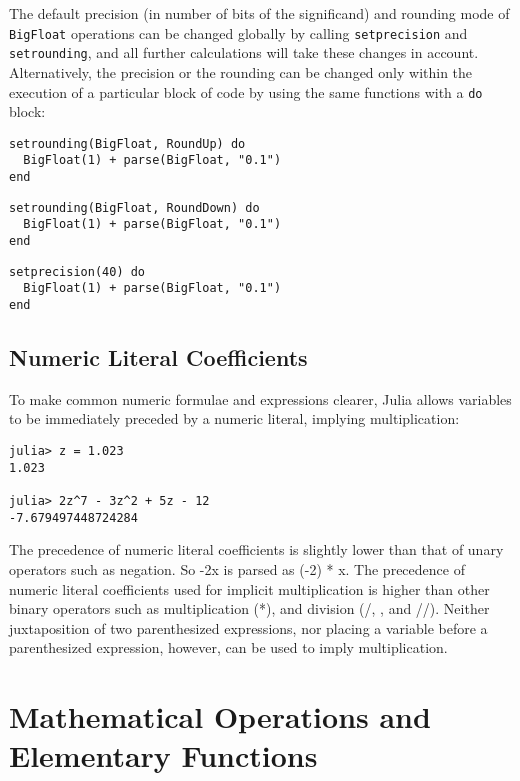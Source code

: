 \documentclass[
]{article}
\begin{document}
The default precision (in number of bits of the significand) and
rounding mode of \texttt{BigFloat} operations can be changed globally by
calling \texttt{setprecision} and \texttt{setrounding}, and all further
calculations will take these changes in account. Alternatively, the
precision or the rounding can be changed only within the execution of a
particular block of code by using the same functions with a \texttt{do}
block:

\begin{verbatim}
setrounding(BigFloat, RoundUp) do
  BigFloat(1) + parse(BigFloat, "0.1")
end
\end{verbatim}

\begin{verbatim}
setrounding(BigFloat, RoundDown) do
  BigFloat(1) + parse(BigFloat, "0.1")
end
\end{verbatim}

\begin{verbatim}
setprecision(40) do
  BigFloat(1) + parse(BigFloat, "0.1")
end
\end{verbatim}

\hypertarget{numeric-literal-coefficients}{%
\subsection{Numeric Literal
Coefficients}\label{numeric-literal-coefficients}}

To make common numeric formulae and expressions clearer, Julia allows
variables to be immediately preceded by a numeric literal, implying
multiplication:

\begin{verbatim}
julia> z = 1.023
1.023

julia> 2z^7 - 3z^2 + 5z - 12
-7.679497448724284
\end{verbatim}

The precedence of numeric literal coefficients is slightly lower than
that of unary operators such as negation. So -2x is parsed as (-2) * x.
The precedence of numeric literal coefficients used for implicit
multiplication is higher than other binary operators such as
multiplication (*), and division (/, , and //). Neither juxtaposition of
two parenthesized expressions, nor placing a variable before a
parenthesized expression, however, can be used to imply multiplication.

\newpage

\hypertarget{mathematical-operations-and-elementary-functions}{%
\section{Mathematical Operations and Elementary
Functions}\label{mathematical-operations-and-elementary-functions}}
\end{document}
